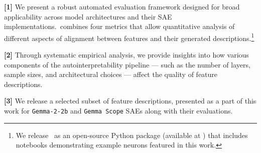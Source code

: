 \textbf{[1]} We present a robust automated evaluation framework designed for broad applicability across model architectures and their SAE implementations.\ours \ combines four metrics that allow quantitative analysis of different aspects of alignment between features and their generated descriptions.\footnote{We release \ours \ as an open-source Python package (available at \repolink) that includes notebooks demonstrating example neurons featured in this work.} \newline

\textbf{[2]} Through systematic empirical analysis, we provide insights into how various components of the autointerpretability pipeline --- such as the number of layers, sample sizes, and architectural choices --- affect the quality of feature descriptions.\newline

\textbf{[3]} We release a selected subset of feature descriptions, presented as a part of this work for \texttt{Gemma-2-2b} and \texttt{Gemma Scope} SAEs along with their evaluations.